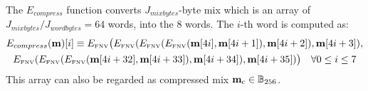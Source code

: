 The $E_{compress}$ function converts $J_{mixbytes}$-byte mix
which is an array of $J_{mixbytes} / J_{wordbytes}=64$ words,
into the 8 words. The $i$-th word is computed as:
\begin{multline}
	E_{compress}(\mathbf{m})[i] \equiv E_\text{\tiny FNV}\big(E_\text{\tiny FNV}(E_\text{\tiny FNV}(E_\text{\tiny FNV}(\mathbf{m}[4i], \mathbf{m}[4i + 1]), \mathbf{m}[4i + 2]), \mathbf{m}[4i + 3]), \\
	E_\text{\tiny FNV}(E_\text{\tiny FNV}(E_\text{\tiny FNV}(\mathbf{m}[4i+32], \mathbf{m}[4i +33]), \mathbf{m}[4i + 34]), \mathbf{m}[4i + 35])\big)\quad \forall 0\le i \le 7
\end{multline}
This array can also be regarded as compressed mix $\mathbf{m}_{\mathrm{c}}\in\mathbb{B}_{256}$.


